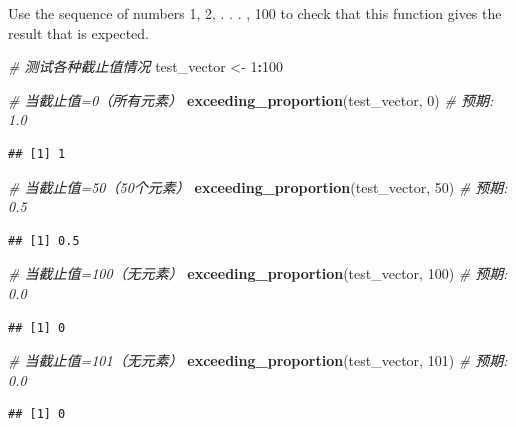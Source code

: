 \documentclass[
]{article}
\newenvironment{Shaded}{\begin{snugshade}}{\end{snugshade}}
\newcommand{\CommentTok}[1]{\textcolor[rgb]{0.56,0.35,0.01}{\textit{#1}}}
\newcommand{\DecValTok}[1]{\textcolor[rgb]{0.00,0.00,0.81}{#1}}
\newcommand{\FunctionTok}[1]{\textcolor[rgb]{0.13,0.29,0.53}{\textbf{#1}}}
\newcommand{\NormalTok}[1]{#1}
\newcommand{\OtherTok}[1]{\textcolor[rgb]{0.56,0.35,0.01}{#1}}
\newcommand{\SpecialCharTok}[1]{\textcolor[rgb]{0.81,0.36,0.00}{\textbf{#1}}}
\begin{document}
Use the sequence of numbers 1, 2, . . . , 100 to check that this
function gives the result that is expected.

\begin{Shaded}
\begin{Highlighting}[]
\CommentTok{\# 测试各种截止值情况}
\NormalTok{test\_vector }\OtherTok{\textless{}{-}} \DecValTok{1}\SpecialCharTok{:}\DecValTok{100}

\CommentTok{\# 当截止值=0（所有元素）}
\FunctionTok{exceeding\_proportion}\NormalTok{(test\_vector, }\DecValTok{0}\NormalTok{)   }\CommentTok{\# 预期: 1.0}
\end{Highlighting}
\end{Shaded}

\begin{verbatim}
## [1] 1
\end{verbatim}

\begin{Shaded}
\begin{Highlighting}[]
\CommentTok{\# 当截止值=50（50个元素）}
\FunctionTok{exceeding\_proportion}\NormalTok{(test\_vector, }\DecValTok{50}\NormalTok{)  }\CommentTok{\# 预期: 0.5}
\end{Highlighting}
\end{Shaded}

\begin{verbatim}
## [1] 0.5
\end{verbatim}

\begin{Shaded}
\begin{Highlighting}[]
\CommentTok{\# 当截止值=100（无元素）}
\FunctionTok{exceeding\_proportion}\NormalTok{(test\_vector, }\DecValTok{100}\NormalTok{) }\CommentTok{\# 预期: 0.0}
\end{Highlighting}
\end{Shaded}

\begin{verbatim}
## [1] 0
\end{verbatim}

\begin{Shaded}
\begin{Highlighting}[]
\CommentTok{\# 当截止值=101（无元素）}
\FunctionTok{exceeding\_proportion}\NormalTok{(test\_vector, }\DecValTok{101}\NormalTok{) }\CommentTok{\# 预期: 0.0}
\end{Highlighting}
\end{Shaded}

\begin{verbatim}
## [1] 0
\end{verbatim}
\end{document}

